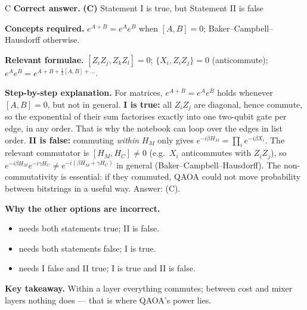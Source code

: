 \documentclass[11pt,a4paper]{article}
\newcommand{\qsep}{\par\vspace{2pt}{\color{black!15}\hrule}\vspace{4pt}}
\begin{document}
\begin{solbox}{C}
\textbf{\color{brand}Correct answer.} \textcolor{okgreen}{\textbf{(C)}} Statement I is true, but Statement II is false

\textbf{\color{brand}Concepts required.} $e^{A+B} = e^Ae^B$ when $[A,B] = 0$; Baker--Campbell--Hausdorff otherwise.

\textbf{\color{brand}Relevant formulae.} $[Z_iZ_j, Z_kZ_l] = 0$; $\{X_i, Z_iZ_j\} = 0$ (anticommute); $e^{A}e^{B} = e^{A + B + \frac12[A,B] + \dots}$.

\textbf{\color{brand}Step-by-step explanation.} For matrices, $e^{A+B} = e^Ae^B$ holds whenever $[A, B] = 0$, but not in general.
\textbf{I is true:} all $Z_iZ_j$ are diagonal, hence commute, so the exponential of their sum factorises exactly into one
two-qubit gate per edge, in any order. That is why the notebook can loop over the edges in list order.
\textbf{II is false:} commuting \emph{within} $H_M$ only gives $e^{-i\beta H_M} = \prod_i e^{-i\beta X_i}$. The relevant
commutator is $[H_M, H_C] \neq 0$ (e.g.\ $X_i$ anticommutes with $Z_iZ_j$), so $e^{-i\beta H_M}e^{-i\gamma H_C} \neq
e^{-i(\beta H_M + \gamma H_C)}$ in general (Baker--Campbell--Hausdorff). The non-commutativity is essential: if they commuted,
QAOA could not move probability between bitstrings in a useful way. Answer: (C).

\textbf{\color{brand}Why the other options are incorrect.}
\begin{itemize}[leftmargin=2.4em, itemsep=1pt, topsep=2pt]
\item[\textbf{(A)}] needs both statements true; II is false.
\item[\textbf{(B)}] needs both statements false; I is true.
\item[\textbf{(D)}] needs I false and II true; I is true and II is false.
\end{itemize}
\textbf{\color{brand}Key takeaway.} Within a layer everything commutes; between cost and mixer layers nothing does --- that is where QAOA's power lies.
\end{solbox}
\qsep
\end{document}
